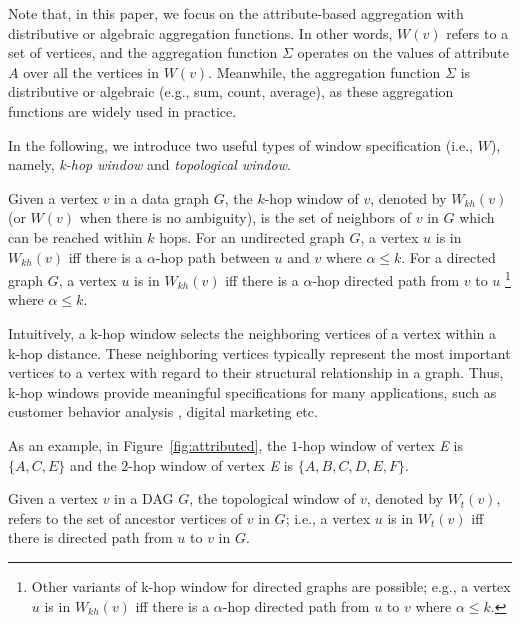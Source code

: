 Note that, in this paper, we focus on the attribute-based aggregation with distributive or algebraic aggregation functions. 
In other words, $W(v)$ refers to a set of vertices, and the aggregation function 
$\Sigma$ operates on the values of attribute $A$ over all the vertices in $W(v)$. Meanwhile, the aggregation function $\Sigma$ is distributive or algebraic (e.g., sum, count, average), as these aggregation functions are widely used in practice. 
 
In the following, we introduce two useful types of window specification (i.e., $W$), namely, 
\emph{k-hop window} and \emph{topological window}.


\begin{definition} 
Given a vertex $v$ in a data graph $G$, 
the $k$-hop window of $v$, denoted by $W_{kh}(v)$ (or $W(v)$ when there is no ambiguity),
is the set of neighbors of $v$ in $G$ which can be reached within $k$ hops.
For an undirected graph $G$,
a vertex $u$ is in $W_{kh}(v)$  iff there is a $\alpha$-hop path between $u$ and $v$ where $\alpha \leqslant k$.
For a directed graph $G$,
a vertex $u$ is in $W_{kh}(v)$  iff there is a $\alpha$-hop directed path from $v$ to $u$ \footnote{
Other variants of k-hop window for directed graphs are possible; e.g.,
a vertex $u$ is in $W_{kh}(v)$  iff there is a $\alpha$-hop directed path from $u$ to $v$ where $\alpha \leqslant k$.
} where $\alpha \leqslant k$.
\end{definition}

Intuitively, a k-hop window selects the neighboring vertices of a 
vertex within a  k-hop distance. 
These neighboring vertices typically represent the most important 
vertices to a vertex with regard to their structural relationship in a graph. 
Thus, k-hop windows provide meaningful specifications for many applications, such as customer behavior analysis \cite{briscoe2013determining,dai2012predicting} , digital marketing \cite{ma2010ego} etc.

As an example, in Figure~\ref{fig:attributed}, the $1$-hop window of vertex \emph{E} is $\{A,C,E\}$ and the $2$-hop window of vertex \emph{E} is $\{A,B,C,D,E,F\}$.  

\begin{definition} 
Given a vertex $v$ in a DAG $G$, the topological window of $v$, denoted by $W_t(v)$,
refers to the set of ancestor vertices  of $v$ in $G$;
i.e., a vertex $u$ is in $W_t(v)$ iff there is directed path from $u$ to $v$ in $G$.
\end{definition}

